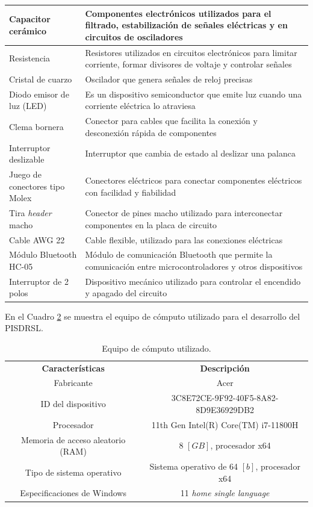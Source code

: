 \documentclass{article}
\begin{document}
\begin{table}[H]
\begin{tabular}{|p{5cm}|p{10cm}|}
		Capacitor cerámico & Componentes electrónicos utilizados para el filtrado, estabilización de señales eléctricas y en circuitos de osciladores \\\hline
		Resistencia & Resistores utilizados en circuitos electrónicos para limitar corriente, formar divisores de voltaje y controlar señales \\\hline
		Cristal de cuarzo & Oscilador que genera señales de reloj precisas \\ \hline
        Diodo emisor de luz (LED) & Es un dispositivo semiconductor que emite luz cuando una corriente eléctrica lo atraviesa\\ \hline
        Clema bornera & Conector para cables que facilita la conexión y desconexión rápida de componentes\\ \hline
        Interruptor deslizable & Interruptor que cambia de estado al deslizar una palanca\\ \hline
        Juego de conectores tipo Molex & Conectores eléctricos para conectar componentes eléctricos con facilidad y fiabilidad\\ \hline
        Tira \textit{header} macho & Conector de pines macho utilizado para interconectar componentes en la placa de circuito\\ \hline
        Cable AWG 22 & Cable flexible, utilizado para las conexiones eléctricas\\ \hline
        Módulo Bluetooth HC-05 & Módulo de comunicación Bluetooth que permite la comunicación entre microcontroladores y otros dispositivos\\ \hline
		Interruptor de 2 polos & Dispositivo mecánico utilizado para controlar el encendido y apagado del circuito \\ \hline
	\end{tabular}
	\label{tabla:descripcion}
\end{table}

En el Cuadro \ref{tabla:computadora} se muestra el equipo de cómputo utilizado para el desarrollo del PISDRSL.  

\begin{table}[H]
\centering
\caption{Equipo de cómputo utilizado.} 
\begin{tabular}{|c|c|}\hline
    \rowcolor{gray!30}
    \multicolumn{2}{|c|}{\textbf{\textit{laptop} de Anna Patricia Fernández}} \\ \hline
    \rowcolor{gray!30}
    \textbf{Características} & \textbf{Descripción} \\ \hline
Fabricante & Acer\\
ID del dispositivo & 3C8E72CE-9F92-40F5-8A82-8D9E36929DB2 \\
Procesador & 11th Gen Intel(R) Core(TM) i7-11800H\\
Memoria de acceso aleatorio (RAM) & 8 $[GB]$, procesador x64\\
Tipo de sistema operativo & Sistema operativo de 64 $[b]$, procesador x64\\
Especificaciones de Windows & 11 \textit{home single language}
\\
\hline
\end{tabular}
\label{tabla:computadora}
\end{table}
\end{document}
